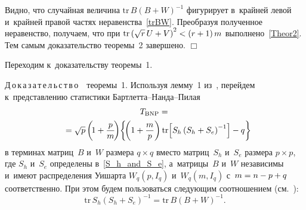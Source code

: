 \begin{multicols}{2}
Видно, что случайная величина $\mathrm{tr}\,{B\left(B+W\right)^{-1}}$ фигурирует в~крайней 
левой и~крайней правой час\-тях неравенства~\eqref{trBW}.
Преобразуя полученное неравенство, получаем, что при 
$\mathrm{tr}\,{\left(\sqrt{r}\,U+\hm V\right)^{2}}\hm<\left(r\hm+1\right)m$ выполнено~\eqref{Theor2}. 
Тем самым доказательство теоремы~2 завершено.
\hfill $\Box$

\smallskip

Переходим к~доказательству теоремы~1.

\smallskip

\noindent
Д\,о\,к\,а\,з\,а\,т\,е\,л\,ь\,с\,т\,в\,о\ \ теоремы~1.
Используя лемму~1 из~\cite{lit:WFU}, перейдем к~представлению статистики 
Барт\-лет\-та--Нан\-да--Пи\-лая
\begin{multline*}
T_{\mathrm{BNP}}={}\\
{}=\sqrt{p}\left(\!1+\displaystyle\frac{\displaystyle p\mathstrut}{\displaystyle m\mathstrut}\!\right)\!\left\{\!\left(1+\displaystyle\frac{\displaystyle m\mathstrut}{\displaystyle p\mathstrut}\right)\mathrm{tr}\!\left[S_{h}
\left(S_{h}+S_{e}\right)^{-1}\right]-q\right\}\hspace*{-4.9pt}
\end{multline*}
в терминах матриц~$B$ и~$W$ размера $q \times q$ вместо матриц~$S_{h}$ и~$S_{e}$ 
размера $p \times p$, где $S_{h}$ и~$S_{e}$ определены в~\eqref{S_h_and_S_e}, 
а~матрицы~$B$ и~$W$ независимы и~имеют распределения Уишарта $W_{q}\left(p, 
I_{q}\right)$ и~$W_{q}\left(m, I_{q}\right)$ с~$m\hm=n\hm-p\hm+q$ соответственно.
При этом будем пользоваться сле\-ду\-ющим соотношением (см.~\cite{lit:WFU}):
$$
\mathrm{tr}\,{S_{h}\left(S_{h}+S_{e}\right)^{-1}}=
\mathrm{tr}\,{B\left(B+W\right)^{-1}}.
$$


\end{multicols}
